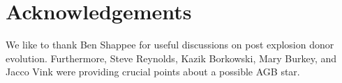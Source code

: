 \documentclass[preprint2]{aastex}
\begin{document}
\section{Acknowledgements}

We like to thank Ben Shappee for useful discussions on post explosion donor evolution. Furthermore, Steve Reynolds, Kazik Borkowski, Mary Burkey, and Jacco Vink were providing crucial points about a possible AGB star. 



\end{document}
